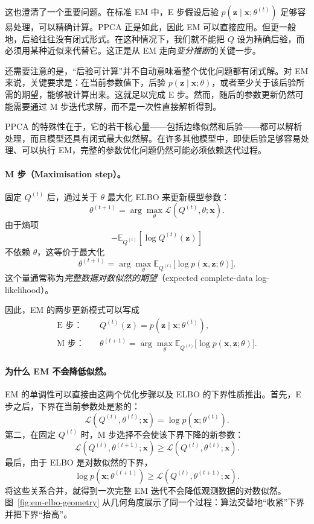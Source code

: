 这也澄清了一个重要问题。在标准 EM 中，E 步假设后验 \(p(\mathbf{z}\mid\mathbf{x};\theta^{(t)})\) 足够容易处理，可以精确计算。PPCA 正是如此，因此 EM 可以直接应用。但更一般地，后验往往没有闭式形式。在这种情况下，我们就不能把 \(Q\) 设为精确后验，而必须用某种近似来代替它。这正是从 EM 走向\emph{变分推断}的关键一步。

还需要注意的是，“后验可计算”并不自动意味着整个优化问题都有闭式解。对 EM 来说，关键要求是：在当前参数值下，后验 \(p(\mathbf{z}\mid\mathbf{x};\theta)\)，或者至少关于该后验所需的期望，能够被计算出来。这就足以完成 E 步。然而，随后的参数更新仍然可能需要通过 M 步迭代求解，而不是一次性直接解析得到。

PPCA 的特殊性在于，它的若干核心量——包括边缘似然和后验——都可以解析处理，而且模型还具有闭式最大似然解。在许多其他模型中，即使后验足够容易处理、可以执行 EM，完整的参数优化问题仍然可能必须依赖迭代过程。

\paragraph{M 步（Maximisation step）。}
固定 \(Q^{(t)}\) 后，通过关于 \(\theta\) 最大化 ELBO 来更新模型参数：
\[
\theta^{(t+1)}
=
\arg\max_{\theta}
\mathcal{L}(Q^{(t)},\theta;\mathbf{x}).
\]
由于熵项
\[
-\mathbb{E}_{Q^{(t)}}[\log Q^{(t)}(\mathbf{z})]
\]
不依赖 \(\theta\)，这等价于最大化
\[
\theta^{(t+1)}
=
\arg\max_{\theta}
\mathbb{E}_{Q^{(t)}}\big[\log p(\mathbf{x},\mathbf{z};\theta)\big].
\]
这个量通常称为\emph{完整数据对数似然的期望}（expected complete-data log-likelihood）。

因此，EM 的两步更新模式可以写成
\[
\boxed{
\begin{aligned}
\text{E 步：}\quad
&Q^{(t)}(\mathbf{z})=p(\mathbf{z}\mid\mathbf{x};\theta^{(t)}),\\[4pt]
\text{M 步：}\quad
&\theta^{(t+1)}
=
\arg\max_{\theta}
\mathbb{E}_{Q^{(t)}}\big[\log p(\mathbf{x},\mathbf{z};\theta)\big].
\end{aligned}}
\]

\paragraph{为什么 EM 不会降低似然。}
EM 的单调性可以直接由这两个优化步骤以及 ELBO 的下界性质推出。首先，E 步之后，下界在当前参数处是紧的：
\[
\mathcal{L}(Q^{(t)},\theta^{(t)};\mathbf{x})
=
\log p(\mathbf{x};\theta^{(t)}).
\]
第二，在固定 \(Q^{(t)}\) 时，M 步选择不会使该下界下降的新参数：
\[
\mathcal{L}(Q^{(t)},\theta^{(t+1)};\mathbf{x})
\ge
\mathcal{L}(Q^{(t)},\theta^{(t)};\mathbf{x}).
\]
最后，由于 ELBO 是对数似然的下界，
\[
\log p(\mathbf{x};\theta^{(t+1)})
\ge
\mathcal{L}(Q^{(t)},\theta^{(t+1)};\mathbf{x}).
\]
将这些关系合并，就得到一次完整 EM 迭代不会降低观测数据的对数似然。图~\ref{fig:em-elbo-geometry} 从几何角度展示了同一个过程：算法交替地“收紧”下界并把下界“抬高”。

